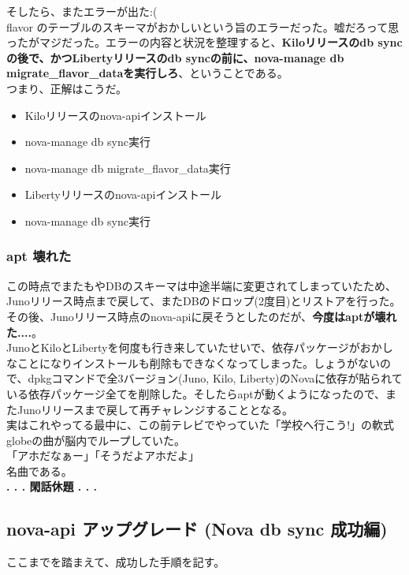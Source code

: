 \documentclass[9pt,b5paper,tombo,openany]{jsbook}
\begin{document}
\noindent
そしたら、またエラーが出た:(\\[1ex]

flavor のテーブルのスキーマがおかしいという旨のエラーだった。嘘だろって思ったがマジだった。エラーの内容と状況を整理すると、\textbf{Kiloリリースのdb syncの後で、かつLibertyリリースのdb syncの前に、nova-manage db migrate\_flavor\_dataを実行しろ}、ということである。\\[1ex]

\noindent
つまり、正解はこうだ。

\begin{itemize}
	\item Kiloリリースのnova-apiインストール
	\item nova-manage db sync実行
	\item nova-manage db migrate\_flavor\_data実行
	\item Libertyリリースのnova-apiインストール
	\item nova-manage db sync実行
\end{itemize}


\subsubsection{apt 壊れた}
この時点でまたもやDBのスキーマは中途半端に変更されてしまっていたため、Junoリリース時点まで戻して、またDBのドロップ(2度目)とリストアを行った。その後、Junoリリース時点のnova-apiに戻そうとしたのだが、\textbf{今度はaptが壊れた....}。\\[1ex]

JunoとKiloとLibertyを何度も行き来していたせいで、依存パッケージがおかしなことになりインストールも削除もできなくなってしまった。しょうがないので、dpkgコマンドで全3バージョン(Juno, Kilo, Liberty)のNovaに依存が貼られている依存パッケージ全てを削除した。そしたらaptが動くようになったので、またJunoリリースまで戻して再チャレンジすることとなる。\\[1ex]

実はこれやってる最中に、この前テレビでやっていた「学校へ行こう!」の軟式globeの曲が脳内でループしていた。\\[1ex]

\noindent
「アホだなぁー」「そうだよアホだよ」\\[1ex]

\noindent
名曲である。\\[1ex]

\noindent
\textbf{. . . 閑話休題 . . .}


\subsection{nova-api アップグレード (Nova db sync 成功編)}
\noindent
ここまでを踏まえて、成功した手順を記す。\\[1ex]
\end{document}
